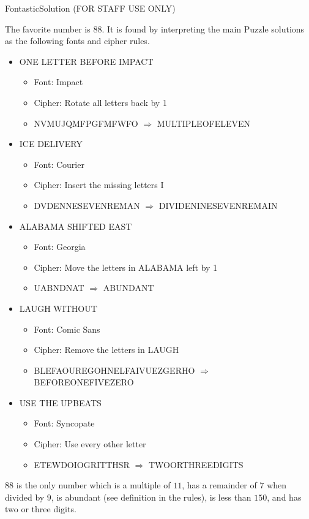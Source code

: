 

\begin{metapuzzle}{Fontastic}{Solution}
(FOR STAFF USE ONLY)

The favorite number is \(88\). It is found by interpreting the main Puzzle
solutions as the following fonts and cipher rules.

\begin{itemize}
\item ONE LETTER BEFORE IMPACT
  \begin{itemize}
    \item Font: Impact
    \item Cipher: Rotate all letters back by 1
    \item NVMUJQMFPGFMFWFO \(\Rightarrow\) MULTIPLEOFELEVEN
  \end{itemize}
\item ICE DELIVERY
  \begin{itemize}
    \item Font: Courier
    \item Cipher: Insert the missing letters I
    \item DVDENNESEVENREMAN \(\Rightarrow\) DIVIDENINESEVENREMAIN
  \end{itemize}
\item ALABAMA SHIFTED EAST
  \begin{itemize}
    \item Font: Georgia
    \item Cipher: Move the letters in ALABAMA left by 1
    \item UABNDNAT \(\Rightarrow\) ABUNDANT
  \end{itemize}
\item LAUGH WITHOUT
  \begin{itemize}
    \item Font: Comic Sans
    \item Cipher: Remove the letters in LAUGH
    \item BLEFAOUREGOHNELFAIVUEZGERHO \(\Rightarrow\) BEFOREONEFIVEZERO
  \end{itemize}
\item USE THE UPBEATS
  \begin{itemize}
    \item Font: Syncopate
    \item Cipher: Use every other letter
    \item ETEWDOIOGRITTHSR \(\Rightarrow\) TWOORTHREEDIGITS
  \end{itemize}
\end{itemize}

\(88\) is the only number which is a multiple of \(11\), has a remainder
of \(7\) when divided by \(9\), is abundant (see definition in the rules),
is less than \(150\), and has two or three digits.

\end{metapuzzle}

\newpage





